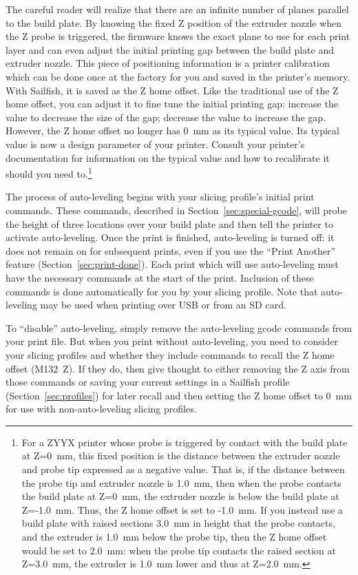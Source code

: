 The careful reader will realize that there are an infinite number of
planes parallel to the build plate.  By knowing the fixed Z position of the extruder
nozzle when the Z probe is triggered, the firmware
knows the exact plane to use for each print layer and can even adjust
the initial printing gap between the build plate and extruder nozzle.
This piece of positioning information is a printer calibration
which can be done once at the factory for you and saved in the printer's
memory.  With Sailfish, it is saved as the Z home offset.  Like the traditional
use of the Z home offset, you can adjust it to fine tune the initial
printing gap: increase the value to
decrease the size of the gap; decrease the value to increase the gap.  However,
the Z home offset no longer has 0~mm as its typical value.  Its typical value
is now a design parameter of your printer.  Consult your printer's
documentation for information on the typical value and how to recalibrate it
should you need to.\footnote{For a ZYYX printer whose probe is triggered by
contact with the build plate at Z=0~mm, this fixed position is the distance between
the extruder nozzle and probe tip expressed as a negative value.  That is,
if the distance between the probe tip and extruder nozzle is 1.0~mm, then
when the probe contacts the build plate at Z=0~mm, the extruder nozzle is
below the build plate at Z=-1.0~mm.  Thus, the Z home offset is set to -1.0~mm.
If you instead use a build plate with raised sections 3.0~mm in height
that the probe contacts, and the extruder is 1.0~mm below the probe tip,
then the Z home offset would be set to 2.0~mm: when the probe tip
contacts the raised section at Z=3.0~mm, the extruder is 1.0~mm lower
and thus at Z=2.0~mm.}

The process of auto-leveling begins with your slicing profile's
initial print commands.  These commands, described in
Section~\ref{sec:special-gcode}, will probe the height of three
locations over your build plate and then tell the printer to activate
auto-leveling.  Once the print is finished, auto-leveling is turned
off: it does not remain on for subsequent prints, even if you use the
``Print Another'' feature (Section~\ref{sec:print-done}).  Each print
which will use auto-leveling must have the necessary commands at the
start of the print.  Inclusion of these commands is done automatically
for you by your slicing profile.  Note that auto-leveling may be used
when printing over USB or from an SD card.

To ``disable'' auto-leveling, simply remove the auto-leveling gcode commands
from your print file. But when you print without auto-leveling, you need to consider
your slicing profiles and whether they include commands to recall the Z home
offset (M132~Z).  If they do, then give thought to either removing the Z axis from
those commands or saving your current settings in a Sailfish profile (Section~\ref{sec:profiles})
for later recall and then setting the Z home offset to 0~mm for use with
non-auto-leveling slicing profiles.

